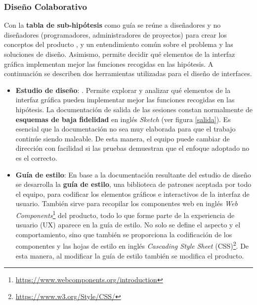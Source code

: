 \subsubsection{Diseño Colaborativo}

\label{dis-colabo}
 Con la \textbf{tabla de sub-hipótesis} como guía se reúne a diseñadores y no diseñadores (programadores, administradores de proyectos) 
 para crear los conceptos del producto 
 , y un entendimiento común sobre el problema y las soluciones de diseño. 
 Asimismo, permite decidir qué  elementos de la interfaz gráfica implementan mejor las funciones recogidas en las hipótesis.
 A continuación se describen dos herramientas utilizadas para el diseño de interfaces.
 
 \begin{itemize}
     \item \textbf{Estudio de diseño}: 
    \citep{Gothelf2013}. Permite explorar y analizar qué elementos de la interfaz gráfica pueden implementar mejor las funciones recogidas en las hipótesis.
    La documentación de salida de las sesiones constan normalmente de \textbf{esquemas de baja fidelidad} en inglés \textit{\gls{Sketch}} (ver figura \ref{salida}). Es esencial que la documentación no sea muy elaborada para que el trabajo continúe siendo maleable. De esta manera, el equipo puede cambiar de dirección con facilidad si las pruebas demuestran que el enfoque adoptado no es el correcto.
    \item \textbf{Guía de estilo}: 
    \label{style}
    En base a la documentación resultante del estudio de diseño se desarrolla la \textbf{guía de estilo}, una biblioteca de patrones aceptada por todo el equipo, para codificar los elementos gráficos e interactivos de la interfaz de usuario. También sirve para recopilar los componentes web en inglés \textit{\Gls{Web Components}}\footnote{\url{https://www.webcomponents.org/introduction}} del producto, todo lo que forme parte de la experiencia de usuario (UX) aparece en la guía de estilo. No solo se define el aspecto y el comportamiento, sino que también se proporciona la codificación de los componentes y las hojas de estilo en inglés \textit{Cascading Style Sheet} (\gls{CSS})\footnote{\url{https://www.w3.org/Style/CSS/}}. De esta manera, al modificar la guía de estilo también se modifica el producto. 
    
    \end{itemize}
 

